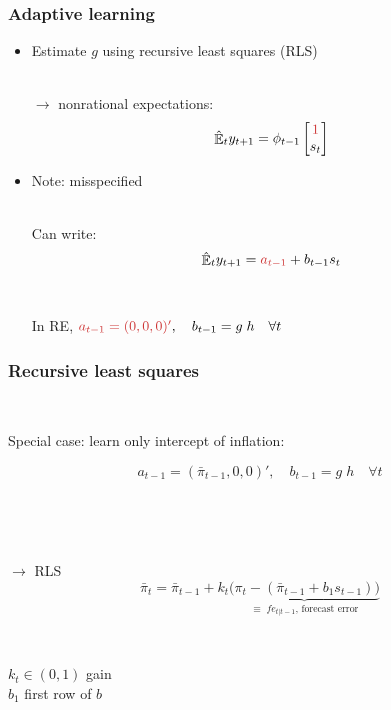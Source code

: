 \documentclass[11pt]{beamer}
\DeclareMathOperator{\E}{\mathbb{E}}
\begin{document}
\begin{frame}
	\frametitle{Adaptive learning}
	\label{adaptive_learning}

\begin{itemize}
\item Estimate $g$ using recursive least squares (RLS)
  \\
  
  \
  
$\rightarrow$ nonrational expectations:
\begin{equation} 
\hat{\E}_t y_{t+1} = \phi_{t-1}\begin{bmatrix} \textcolor{brownreddark}{1} \\ s_{t} \end{bmatrix} \label{PLMcompact}
\end{equation}

\item Note: \textcolor{brownreddark}{misspecified}	\\

\

Can write:
\begin{equation}
\hat{\E}_t y_{t+1} = \textcolor{brownreddark}{a_{t-1}} + b_{t-1}s_t  \label{PLM_fcst_general}
\end{equation}

\

In RE, $\textcolor{brownreddark}{a_{t-1} = (0,0,0)'}, \quad b_{t-1} = g\;h \quad \forall t$
\end{itemize}


\end{frame}

\begin{frame}
	\frametitle{Recursive least squares}
	\label{RLS_special}
	
	\
	
Special case: learn only intercept of inflation:

\begin{equation}
a_{t-1} = (\bar{\pi}_{t-1},0,0)', \quad b_{t-1} = g\; h \quad \forall t
\end{equation}

\

\

$\rightarrow$ RLS
\begin{equation}
\bar{\pi}_{t}  =\bar{\pi}_{t-1} +k_t \underbrace{\big(\pi_{t} -(\bar{\pi}_{t-1}+b_1 s_{t-1}) \big)}_{\equiv \; fe_{t|t-1} \text{, forecast error} } 
\end{equation}
 
 \
 
 $k_t \in (0,1)$ gain \\
 $b_1$ first row of $b$
\vfill 

\hfill \hyperlink{RLS}{}




\end{frame}
\end{document}
